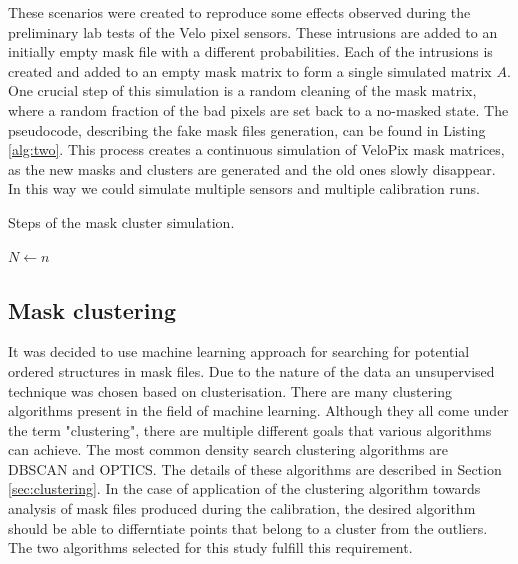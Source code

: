 These scenarios were created to reproduce some effects observed during the preliminary lab tests of the Velo pixel sensors.
These intrusions are added to an initially empty mask file with a different probabilities. Each of the intrusions is created and added to an empty mask matrix to form a single simulated matrix $A$.
One crucial step of this simulation is a random cleaning of the mask matrix, where a random fraction 
of the bad pixels are set back to a no-masked state.
The pseudocode, describing the fake mask files generation, can be found in Listing \ref{alg:two}.
This process creates a continuous simulation of VeloPix mask matrices, as the new masks and clusters are generated and the old ones slowly disappear. In this way we could simulate multiple sensors and multiple calibration runs.

\begin{center}
\begin{algorithm}[H]
\caption{Steps of the mask cluster simulation.}\label{alg:two}
$N \gets n$\;
\end{algorithm}
\end{center}
\subsection{Mask clustering}

It was decided to use machine learning approach for searching for potential ordered structures in mask files. Due to the nature of the data an unsupervised technique was chosen based on clusterisation.
There are many clustering algorithms present in the field of machine learning. Although they all come under the term "clustering", there are multiple different goals that various algorithms can achieve. The most common density search clustering algorithms are DBSCAN and OPTICS. The details of these algorithms are described in Section \ref{sec:clustering}.
In the case of application of the clustering algorithm towards analysis of mask files produced during the calibration, the desired algorithm should be able to differntiate points that belong to a cluster from the outliers.
The two algorithms selected for this study fulfill this requirement.


